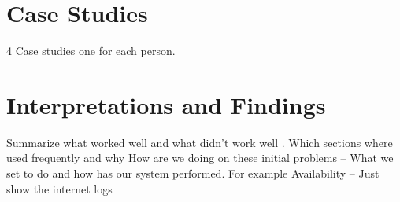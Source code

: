 \section{Case Studies}
4 Case studies one for each person.

\section{Interpretations and Findings}  
Summarize what worked well and what didn’t work well .
Which sections where used frequently and why 
How are we doing on these initial problems – What we set to do and how has our system performed.
For example Availability – Just show the internet logs

